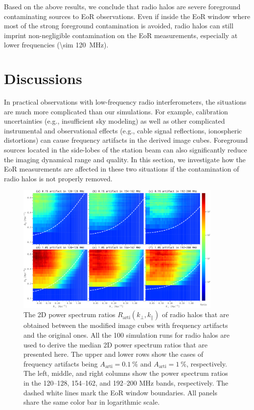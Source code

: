 \documentclass[twocolumn]{aastex62}
\newcommand{\R}[1]{\mathrm{#1}}
\newcommand{\klos}{\text{$k_{\parallel}$}}
\newcommand{\kperp}{\text{$k_{\bot}$}}
\begin{document}
Based on the above results, we conclude that radio halos are severe
foreground contaminating sources to EoR observations.
Even if inside the EoR window where most of the strong foreground
contamination is avoided, radio halos can still imprint
non-negligible contamination on the EoR measurements, especially at
lower frequencies (\SI{\sim 120}{\MHz}).


\section{Discussions}
\label{sec:discussions}

In practical observations with low-frequency radio interferometers, the
situations are much more complicated than our simulations.
For example, calibration uncertainties (e.g., insufficient sky modeling)
as well as other complicated instrumental and observational effects
(e.g., cable signal reflections, ionospheric distortions) can cause
frequency artifacts in the derived image cubes.
Foreground sources located in the side-lobes of the station beam can
also significantly reduce the imaging dynamical range and quality.
In this section, we investigate how the EoR measurements are affected
in these two situations if the contamination of radio halos is not
properly removed.

\begin{figure}
  \centering
  \includegraphics[width=0.9\textwidth]{ps2d-ratio-crp-halos-3bands}
  \caption{\label{fig:ps2d-ratio-crp}%
    The 2D power spectrum ratios $R_{\R{arti}}(\kperp, \klos)$ of radio
    halos that are obtained between the modified image cubes with
    frequency artifacts and the original ones.
    All the 100 simulation runs for radio halos are used to derive
    the median 2D power spectrum ratios that are presented here.
    The upper and lower rows show the cases of frequency artifacts
    being $A_{\R{arti}} = \SI{0.1}{\percent}$ and
    $A_{\R{arti}} = \SI{1}{\percent}$, respectively.
    The left, middle, and right columns show the power spectrum ratios
    in the \numrange{120}{128}, \numrange{154}{162}, and
    \numrange{192}{200} \si{\MHz} bands, respectively.
    The dashed white lines mark the EoR window boundaries.
    All panels share the same color bar in logarithmic scale.
  }
\end{figure}
\end{document}

